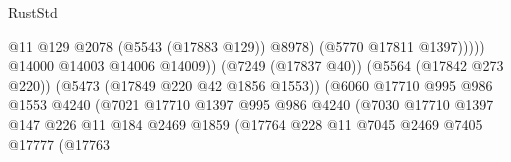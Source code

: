 \begin{lexlean}{RustStd}
\begin{coremodule}
                                                              @11
                                                              @129
                                                              @2078
                                                              (@5543 (@17883 @129))
                                                              @8978)
                                                            (@5770 @17811 @1397)))))
                                                    @14000
                                                    @14003
                                                    @14006
                                                    @14009))
                                                (@7249 (@17837 @40))
                                                (@5564 (@17842 @273 @220))
                                                (@5473 (@17849 @220 @42 @1856 @1553))
                                                (@6060
                                                  @17710
                                                  @995
                                                  @986
                                                  @1553
                                                  @4240
                                                  (@7021
                                                    @17710
                                                    @1397
                                                    @995
                                                    @986
                                                    @4240
                                                    (@7030
                                                      @17710
                                                      @1397
                                                      @147
                                                      @226
                                                      @11
                                                      @184
                                                      @2469
                                                      @1859
                                                      (@17764
                                                        @228
                                                        @11
                                                        @7045
                                                        @2469
                                                        @7405
                                                        @17777
                                                        (@17763

\end{coremodule}
\end{lexlean}
